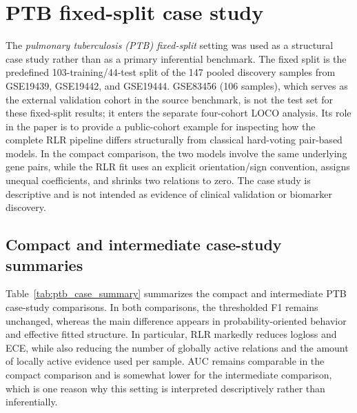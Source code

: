 \documentclass[11pt, a4paper]{article}
\begin{document}
\section{PTB fixed-split case study}

The \emph{pulmonary tuberculosis (PTB) fixed-split} setting was used as a structural case study rather than as a primary inferential benchmark. The fixed split is the predefined 103-training/44-test split of the 147 pooled discovery samples from GSE19439, GSE19442, and GSE19444. GSE83456 (106 samples), which serves as the external validation cohort in the source benchmark, is not the test set for these fixed-split results; it enters the separate four-cohort LOCO analysis.
Its role in the paper is to provide a public-cohort example for inspecting how the complete RLR pipeline differs structurally from classical hard-voting pair-based models. In the compact comparison, the two models involve the same underlying gene pairs, while the RLR fit uses an explicit orientation/sign convention, assigns unequal coefficients, and shrinks two relations to zero. The case study is descriptive and is not intended as evidence of clinical validation or biomarker discovery.


\subsection{Compact and intermediate case-study summaries}

Table~\ref{tab:ptb_case_summary} summarizes the compact and intermediate PTB case-study comparisons. In both comparisons, the thresholded F1 remains unchanged, whereas the main difference appears in probability-oriented behavior and effective fitted structure. In particular, RLR markedly reduces logloss and ECE, while also reducing the number of globally active relations and the amount of locally active evidence used per sample. AUC remains comparable in the compact comparison and is somewhat lower for the intermediate comparison, which is one reason why this setting is interpreted descriptively rather than inferentially.
\end{document}
